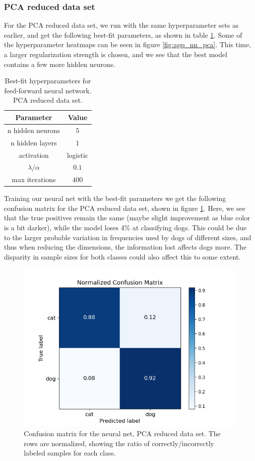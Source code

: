 \documentclass[a4paper]{article}
\begin{document}
\subsubsection{PCA reduced data set}
For the PCA reduced data set, we run with the same hyperparameter sets as earlier, and get the following best-fit parameters, as shown in table \ref{tab:best_fit_nn_pca}. Some of the hyperparameter heatmaps can be seen in figure \ref{fig:app_nn_pca}. This time, a larger regularization strength is chosen, and we see that the best model contains a few more hidden neurons.
\begin{table}[H]
  \centering
  \caption{Best-fit hyperparameters for feed-forward neural network. PCA reduced data set.}
  \label{tab:best_fit_nn_pca}
  \begin{tabular}{c|c}
    \hline\hline
    Parameter & Value\\\hline
    n hidden neurons &  $5$\\
    n hidden layers &  $1$\\
    activation & logistic \\
    $\lambda$/$\alpha$  & $0.1$\\
    max iterations & $400$
    \end{tabular}
\end{table}
Training our neural net with the best-fit parameters we get the following confusion matrix for the PCA reduced data set, shown in figure \ref{fig:nn_confusion_pca}. Here, we see that the true positives remain the same (maybe slight improvement as blue color is a bit darker), while the model loses 4\% at classifying dogs. This could be due to the larger probable variation in frequencies used by dogs of different sizes, and thus when reducing the dimensions, the information lost affects dogs more. The disparity in sample sizes for both classes could also affect this to some extent.
\begin{figure}[H]
	\centering
	\includegraphics[scale=0.6]{../figures/neural_net/confusion_matrix_nbins200_pca35_seed4155_ts0.20.png}
	\caption{Confusion matrix for the neural net, PCA reduced data set. The rows are normalized, showing the ratio of correctly/incorrectly labeled samples for each class.}
	\label{fig:nn_confusion_pca}
\end{figure}	
\end{document}
